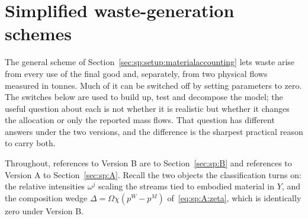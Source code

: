 ﻿\section{Simplified waste-generation schemes}\label{sec:sp:schemes}

The general scheme of Section~\ref{sec:sp:setup:materialaccounting} lets waste arise from every use of
the final good and, separately, from two physical flows measured in tonnes. Much of it can be switched
off by setting parameters to zero. The switches below are used to build up, test and decompose the
model; the useful question about each is not whether it is realistic but whether it changes the
allocation or only the reported mass flows. That question has different answers under the two versions,
and the difference is the sharpest practical reason to carry both.

Throughout, references to Version B are to Section~\ref{sec:sp:B} and references to Version A to
Section~\ref{sec:sp:A}. Recall the two objects the classification turns on: the relative intensities
$\omega^j$ scaling the streams tied to embodied material in $Y$, and the composition wedge
$\Delta=\Omega\chi\left(p^W-p^M\right)$ of~\eqref{eq:sp:A:zeta}, which is identically zero under
Version B.


